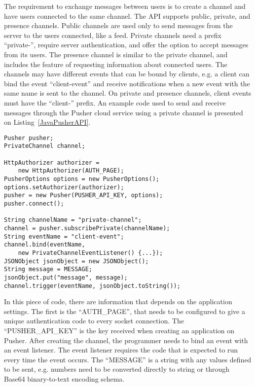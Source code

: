 The requirement to exchange messages between users is to create a channel and have users connected to the same channel.
The API supports public, private, and presence channels.
Public channels are used only to send messages from the server to the users connected, like a feed.
Private channels need a prefix ``private-'', require server authentication, and offer the option to accept messages from its users.
The presence channel is similar to the private channel, and includes the feature of requesting information about connected users. 
The channels may have different events that can be bound by clients, e.g. a client can bind the event ``client-event'' and receive notifications when a new event with the same name is sent to the channel.
On private and presence channels, client events must have the ``client-'' prefix.
An example code used to send and receive messages through the Pusher cloud service using a private channel is presented on Listing~\ref{JavaPusherAPI}.

\begin{footnotesize}
\lstset{language=Java, caption=Example of Java code from Pusher API, captionpos=b, label=JavaPusherAPI, numbers=none, numberstyle=\scriptsize}
\begin{lstlisting}[frame=single]
Pusher pusher;
PrivateChannel channel;

HttpAuthorizer authorizer = 
	new HttpAuthorizer(AUTH_PAGE);
PusherOptions options = new PusherOptions();
options.setAuthorizer(authorizer);
pusher = new Pusher(PUSHER_API_KEY, options);
pusher.connect();

String channelName = "private-channel";
channel = pusher.subscribePrivate(channelName);
String eventName = "client-event";
channel.bind(eventName, 
	new PrivateChannelEventListener() {...});
JSONObject jsonObject = new JSONObject();
String message = MESSAGE;
jsonObject.put("message", message);
channel.trigger(eventName, jsonObject.toString());
\end{lstlisting}
\end{footnotesize}

In this piece of code, there are information that depends on the application settings.
The first is the ``AUTH\_PAGE'', that needs to be configured to give a unique authentication code to every socket connection.
The ``PUSHER\_API\_KEY'' is the key received when creating an application on Pusher.
After creating the channel, the programmer needs to bind an event with an event listener.
The event listener requires the code that is expected to run every time the event occurs.
The ``MESSAGE'' is a string with any values defined to be sent, e.g. numbers need to be converted directly to string or through Base64 binary-to-text encoding schema.


